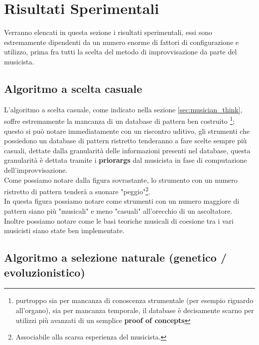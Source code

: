 \section{Risultati Sperimentali}
Verranno elencati in questa sezione i risultati sperimentali, essi
sono estremamente dipendenti da un numero enorme di fattori di configurazione
e utilizzo, prima fra tutti la scelta del metodo di improvvisazione da parte
del musicista.

\subsection{Algoritmo a scelta casuale}
L'algoritmo a scelta casuale, come indicato nella sezione \ref{sec:musician_think},
soffre estremamente la mancanza di un database di pattern ben costruito
\footnote{purtroppo sia per mancanza di conoscenza strumentale
(per esempio riguardo all'organo), sia per mancanza temporale,
il database è decisamente scarno per utilizzi più avanzati di un semplice
\textbf{proof of concepts}};
\\
questo si può notare immediatamente con un riscontro uditivo,
gli strumenti che possiedono un database di pattern ristretto tenderanno
a fare scelte sempre più casuali, dettate dalla granularità delle informazioni
presenti nel database, questa granularità è dettata tramite i \textbf{priorargs}
dal musicista in fase di computazione dell'improvvisazione.\\
Come possiamo notare dalla figura sovrastante, lo strumento con un numero ristretto
di pattern tenderà a suonare "peggio"\footnote{Associabile alla scarsa esperienza del musicista.}.
\\
In questa figura possiamo notare come strumenti con un numero maggiore di pattern siano
più "musicali" e meno "casuali" all'orecchio di un ascoltatore.\\
Inoltre possiamo notare come le basi teoriche musicali
di coesione tra i vari musicisti siano state ben implementate.

\subsection{Algoritmo a selezione naturale (genetico / evoluzionistico)}

